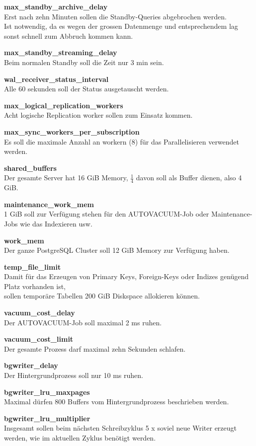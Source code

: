 \begin{description}
    \item \textbf{max\_standby\_archive\_delay}\hfill \\Erst nach zehn Minuten sollen die Standby-Queries abgebrochen werden.\\Ist notwendig, da es wegen der grossen Datenmenge und entsprechendem lag sonst schnell zum Abbruch kommen kann.
    \item \textbf{max\_standby\_streaming\_delay}\hfill \\Beim normalen Standby soll die Zeit nur 3 min sein.
    \item \textbf{wal\_receiver\_status\_interval}\hfill \\Alle 60 sekunden soll der Status ausgetauscht werden.
    \item \textbf{max\_logical\_replication\_workers}\hfill \\Acht logische Replication worker sollen zum Einsatz kommen.
    \item \textbf{max\_sync\_workers\_per\_subscription}\hfill \\Es soll die maximale Anzahl an workern (8) für das Parallelisieren verwendet werden.
    \item \textbf{shared\_buffers}\hfill \\Der gesamte Server hat 16 GiB Memory, \(\frac{1}{4}\) davon soll als Buffer dienen, also 4 GiB.
    \item \textbf{maintenance\_work\_mem}\hfill \\1 GiB soll zur Verfügung stehen für den \Gls{AUTOVACUUM}-Job oder Maintenance-Jobs wie das Indexieren usw.
    \item \textbf{work\_mem}\hfill \\Der ganze \Gls{PostgreSQL Cluster} soll 12 GiB Memory zur Verfügung haben.
    \item \textbf{temp\_file\_limit}\hfill \\Damit für das Erzeugen von Primary Keys, Foreign-Keys oder Indizes genügend Platz vorhanden ist,\\sollen temporäre Tabellen 200 GiB Diskspace allokieren können.
    \item \textbf{vacuum\_cost\_delay}\hfill \\Der \Gls{AUTOVACUUM}-Job soll maximal 2 ms ruhen.
    \item \textbf{vacuum\_cost\_limit}\hfill \\Der gesamte Prozess darf maximal zehn Sekunden schlafen.
    \item \textbf{bgwriter\_delay}\hfill \\Der Hintergrundprozess soll nur 10 ms ruhen.
    \item \textbf{bgwriter\_lru\_maxpages}\hfill \\Maximal dürfen 800 Buffers vom Hintergrundprozess beschrieben werden.
    \item \textbf{bgwriter\_lru\_multiplier}\hfill \\Insgesamt sollen beim nächsten Schreibzyklus 5 x soviel neue Writer erzeugt werden, wie im aktuellen Zyklus benötigt werden.
\end{description}

